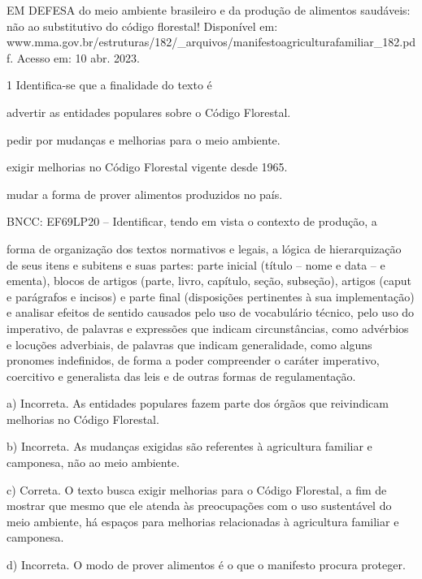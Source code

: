 \begin{escolha}
\begin{escolha}
\begin{escolha}
\begin{escolha}
\begin{escolha}
EM DEFESA do meio ambiente brasileiro e da produção de alimentos
saudáveis: não ao substitutivo do código florestal! Disponível em:
www.mma.gov.br/estruturas/182/\_arquivos/manifestoagriculturafamiliar\_182.pdf.
Acesso em: 10 abr. 2023.

\num{1} Identifica-se que a finalidade do texto é

\begin{escolha}
\item advertir as entidades populares sobre o Código Florestal.

\item pedir por mudanças e melhorias para o meio ambiente.

\item exigir melhorias no Código Florestal vigente desde 1965.

\item mudar a forma de prover alimentos produzidos no país.

\end{escolha}BNCC: EF69LP20 -- Identificar, tendo em vista o contexto de produção, a

forma de organização dos textos normativos e legais, a lógica de
hierarquização de seus itens e subitens e suas partes: parte inicial
(título -- nome e data -- e ementa), blocos de artigos (parte, livro,
capítulo, seção, subseção), artigos (caput e parágrafos e incisos) e
parte final (disposições pertinentes à sua implementação) e analisar
efeitos de sentido causados pelo uso de vocabulário técnico, pelo uso do
imperativo, de palavras e expressões que indicam circunstâncias, como
advérbios e locuções adverbiais, de palavras que indicam generalidade,
como alguns pronomes indefinidos, de forma a poder compreender o caráter
imperativo, coercitivo e generalista das leis e de outras formas de
regulamentação.

a) Incorreta. As entidades populares fazem parte dos órgãos que
reivindicam melhorias no Código Florestal.

b) Incorreta. As mudanças exigidas são referentes à agricultura familiar
e camponesa, não ao meio ambiente.

c) Correta. O texto busca exigir melhorias para o Código Florestal, a
fim de mostrar que mesmo que ele atenda às preocupações com o uso
sustentável do meio ambiente, há espaços para melhorias relacionadas à
agricultura familiar e camponesa.

d) Incorreta. O modo de prover alimentos é o que o manifesto procura
proteger.


\end{escolha}
\end{escolha}
\end{escolha}
\end{escolha}
\end{escolha}
